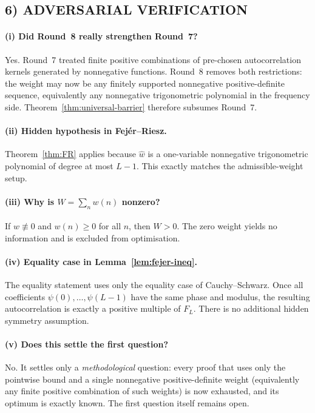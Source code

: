 \subsection{6) ADVERSARIAL VERIFICATION}

\paragraph{(i) Did Round~8 really strengthen Round~7?}
Yes.  Round~7 treated finite positive combinations of pre-chosen autocorrelation kernels generated by nonnegative functions.  Round~8 removes both restrictions: the weight may now be any finitely supported nonnegative positive-definite sequence, equivalently any nonnegative trigonometric polynomial in the frequency side.  Theorem~\ref{thm:universal-barrier} therefore subsumes Round~7.

\paragraph{(ii) Hidden hypothesis in Fej\'er--Riesz.}
Theorem~\ref{thm:FR} applies because $\widehat w$ is a one-variable nonnegative trigonometric polynomial of degree at most $L-1$.  This exactly matches the admissible-weight setup.

\paragraph{(iii) Why is $W=\sum_n w(n)$ nonzero?}
If $w\not\equiv 0$ and $w(n)\ge0$ for all $n$, then $W>0$.  The zero weight yields no information and is excluded from optimisation.

\paragraph{(iv) Equality case in Lemma~\ref{lem:fejer-ineq}.}
The equality statement uses only the equality case of Cauchy--Schwarz.  Once all coefficients $\psi(0),\dots,\psi(L-1)$ have the same phase and modulus, the resulting autocorrelation is exactly a positive multiple of $F_L$.  There is no additional hidden symmetry assumption.

\paragraph{(v) Does this settle the first question?}
No.  It settles only a \emph{methodological} question: every proof that uses only the pointwise bound and a single nonnegative positive-definite weight (equivalently any finite positive combination of such weights) is now exhausted, and its optimum is exactly known.  The first question itself remains open.

